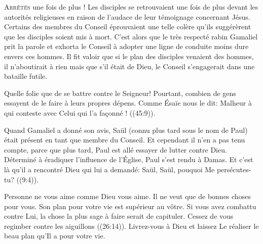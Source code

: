 
\lettrine{A}{rrêtés} une fois de plus !
 Les disciples se retrouvaient une fois de plus devant les autorités
 religieuses en raison de l'audace de leur témoignage concernant Jésus.
 Certains des membres du Conseil éprouvaient une telle colère
 qu'ils suggérèrent que les disciples soient mis à mort.
 C'est alors que le très respecté rabin Gamaliel prit la parole
 et exhorta le Conseil à adopter une ligne de conduite moins dure
 envers ces hommes. Il fit valoir que si le plan des disciples
 venaient des hommes, il n'aboutirait à rien
 \ocadr mais que s'il était de Dieu, le Conseil s'engagerait
 dans une bataille futile.

Quelle folie que de se battre contre le Seigneur!
 Pourtant,  combien de gens essayent de le faire
 \ocadr à leurs propres dépens.
 Comme Ésaïe nous le dit: 
 \Og Malheur à qui conteste avec Celui qui l'a fa\c{c}onné ! \Fg{}
 ((45:9)). 


Quand Gamaliel a donné son avis, Saül (connu plus tard sous le nom de Paul)
 était présent en tant que membre du Conseil.
 Et cependant il n'en a pas tenu compte, parce que plus tard,
 Paul est allé essayer de lutter contre Dieu.
 Déterminé à éradiquer l'influence de l'Église, Paul s'est rendu à Damas.
 Et c'est là qu'il a rencontré Dieu qui lui a demandé: 
 \Og Saül, Saül, pouquoi Me persécutes-tu? \Fg{}
 ((9:4)). 

Personne ne vous aime comme Dieu vous aime.
 Il ne veut que de bonnes choses pour vous.
 Son plan pour votre vie est supérieur au vôtre.
 Si vous avez combattu contre Lui, la chose la plus sage à faire
 serait de capituler. Cessez de vous \Og regimber contre les aiguillons \Fg{}
 ((26:14)). Livrez-vous à Dieu et laissez Le réaliser
 le beau plan qu'Il a pour votre vie.

\dvrule




